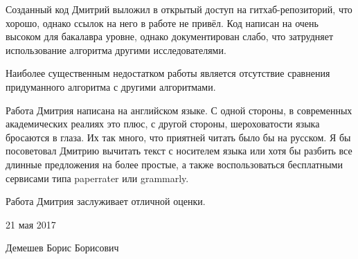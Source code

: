 \documentclass[a4paper, 12pt]{article}
\begin{document}
Созданный код Дмитрий выложил в открытый доступ на гитхаб-репозиторий,
что хорошо, однако ссылок на него в работе не привёл. Код написан на
очень высоком для бакалавра уровне, однако документирован слабо, что
затрудняет использование алгоритма другими исследователями.

Наиболее существенным недостатком работы является отсутствие сравнения
придуманного алгоритма с другими алгоритмами.

Работа Дмитрия написана на английском языке. С одной стороны, в
современных академических реалиях это плюс, с другой стороны,
шероховатости языка бросаются в глаза. Их так много, что приятней читать
было бы на русском. Я бы посоветовал Дмитрию вычитать текст с носителем
языка или хотя бы разбить все длинные предложения на более простые, а
также воспользоваться бесплатными сервисами типа paperrater или
grammarly.

Работа Дмитрия заслуживает отличной оценки.

\vspace{1cm}

21 мая 2017

Демешев Борис Борисович
\end{document}
